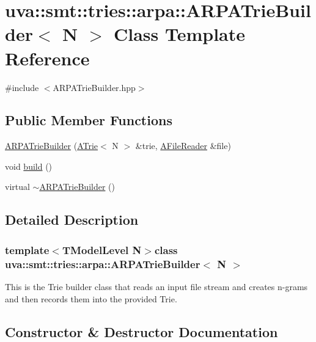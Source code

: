 \hypertarget{classuva_1_1smt_1_1tries_1_1arpa_1_1_a_r_p_a_trie_builder}{}\section{uva\+:\+:smt\+:\+:tries\+:\+:arpa\+:\+:A\+R\+P\+A\+Trie\+Builder$<$ N $>$ Class Template Reference}
\label{classuva_1_1smt_1_1tries_1_1arpa_1_1_a_r_p_a_trie_builder}


{\ttfamily \#include $<$A\+R\+P\+A\+Trie\+Builder.\+hpp$>$}

\subsection*{Public Member Functions}
\begin{DoxyCompactItemize}
\item 
\hyperlink{classuva_1_1smt_1_1tries_1_1arpa_1_1_a_r_p_a_trie_builder_a5381a4b1773965aee6f6cd24513166d0}{A\+R\+P\+A\+Trie\+Builder} (\hyperlink{classuva_1_1smt_1_1tries_1_1_a_trie}{A\+Trie}$<$ N $>$ \&trie, \hyperlink{classuva_1_1smt_1_1file_1_1_a_file_reader}{A\+File\+Reader} \&file)
\item 
void \hyperlink{classuva_1_1smt_1_1tries_1_1arpa_1_1_a_r_p_a_trie_builder_a8e01c726cb800efa9b5f157017eb35f4}{build} ()
\item 
virtual \hyperlink{classuva_1_1smt_1_1tries_1_1arpa_1_1_a_r_p_a_trie_builder_a8f0c6fc6e4f96d52b5380712b681bfef}{$\sim$\+A\+R\+P\+A\+Trie\+Builder} ()
\end{DoxyCompactItemize}


\subsection{Detailed Description}
\subsubsection*{template$<$T\+Model\+Level N$>$class uva\+::smt\+::tries\+::arpa\+::\+A\+R\+P\+A\+Trie\+Builder$<$ N $>$}

This is the Trie builder class that reads an input file stream and creates n-\/grams and then records them into the provided Trie. 

\subsection{Constructor \& Destructor Documentation}
\hypertarget{classuva_1_1smt_1_1tries_1_1arpa_1_1_a_r_p_a_trie_builder_a5381a4b1773965aee6f6cd24513166d0}{}
